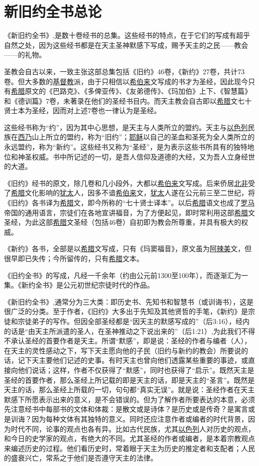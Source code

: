 \chapter{新旧约全书总论}

《新旧约全书》,是数十卷经书的总集。这些经书的特点，在于它们的写成有超乎自然之处，因为这些经书都是在天主圣神默感下写成，赐予天主的之民——教会——的礼物。

圣教会自古以来，一致主张这部总集包括《旧约》46卷，《新约》27卷，共计73卷。但大多数的\uline{基督教}派，由于只相信以\uline{希伯来}文写成的书才为圣经，因此现今只有\uline{希腊}原文的《巴路克》、《多俾亚传》、《友弟德传》、《玛加伯》上下、《智慧篇》和《德训篇》7卷，未著录在他们的圣经书目内。而天主教会自古即以\uline{希腊}文七十贤士本为圣经，因而对上述7卷也一律认为是圣经。

这些经书称为“约”，因为其中心思想，是天主与人类所立的盟约。天主与\uline{以色列}民族在\uline{西乃}山上所立的盟约，称为“旧约”；\uline{耶稣}以自己的圣血和圣死为全人类所立的永远盟约，称为“新约”。这些经书又称为“圣经”，是为表示这些书所具有的独特地位和神圣权威。书中所记述的一切，是吾人信仰及道德的大经，又为吾人立身经世的大道。

《旧约》经书的原文，除几卷和几小段外，大都以\uline{希伯来}文写成。后来侨居\uline{北非}受了\uline{希腊}文化影响的\uline{犹太}人，因多不谙\uline{希伯来}文，\uline{犹太}人遂在公元前三至二世纪，将《旧约》各书译为\uline{希腊}文，即今所称的“七十贤士译本”。以后\uline{希腊}语文也成了\uline{罗马}帝国的通用语言，宗徒们在各地宣讲福音，为了方便起见，即时常利用这部\uline{希腊}文圣经，为此这部\uline{希腊}文圣经（包括46卷）自初即为教会所尊重，并具有极大的权威。

《新约》各书，全部是以\uline{希腊}文写成，只有《玛窦福音》，原文虽为\uline{阿辣美}文，但很早即已失传；今所留传的，只有\uline{希腊}文本。

《旧约全书》的写成，凡经一千余年（约由公元前1300至100年），而逐渐汇为一集。《新约全书》是公元初世纪宗徒时代的作品。

《新旧约全书》,通常分为三大类：即历史书、先知书和智慧书（或训诲书），这是很广泛的分类。至于作者，《旧约》大多出于先知及其他贤哲的手笔，《新约》是宗徒和宗徒弟子的写作。但因全部圣经都是“因天主的默感写成的”（后3:16），经内的话是“由天主所派遣的圣人，在圣神推动之下说出来的”（后1:21）,为此我们不得不承认圣经的首要作者是天主。所谓“默感”，即是说：圣经的作者与编者（人），在天主的灵性感动之下，写下天主愿向他的子民（旧约与新约的教会）所要说的话，记下天主要他们记述的史事。有时天主也曾向他们透露某些重要的事迹，或直接向他们说话；这样，作者不仅获得了“默感”，同时也获得了“启示”。既然天主是圣经的首要作者，那么圣经上所记载的即是天主的话，即是天主的“圣言”。既然是天主的话，那么圣经上所载的一切，句句都“真实无误”。就是说：圣经作者在天主默感下所愿表示出来的意义，是不会错误的。但为了解作者所要表达的本意，必须先注意经书中每部书的文体和体裁：是散文或是诗体？是历史或是传奇？是寓言或是训诲？因为每种文体有其独特的意义。同时还应注意作者或编者的时代背景，因为时代不同，论事的观点也各有异。比如古代民族，尤其\uline{以色列}人对历史的观点，和今日的史学家的观点，有绝大的不同。尤其圣经的作者或编者，是本着宗教观点来编述历史的过程。他们看历史时，常着眼于天主为历史的推定者和支配者；人民的盛衰兴亡，常系之于他们是否遵守天主的法律。

